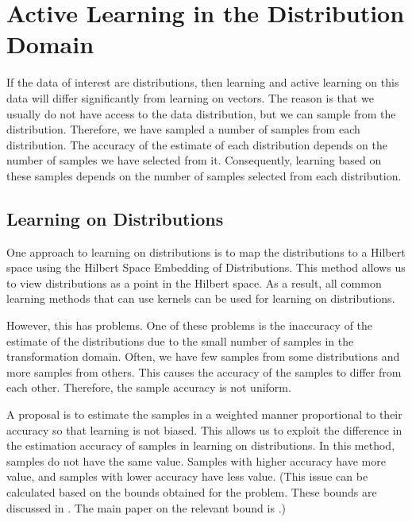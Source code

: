 	\section{Active Learning in the Distribution Domain}
	If the data of interest are distributions, then learning and active learning on this data will differ significantly from learning on vectors. The reason is that we usually do not have access to the data distribution, but we can sample from the distribution. Therefore, we have sampled a number of samples from each distribution. The accuracy of the estimate of each distribution depends on the number of samples we have selected from it. Consequently, learning based on these samples depends on the number of samples selected from each distribution.
	
	\subsection{Learning on Distributions}
	One approach to learning on distributions is to map the distributions to a Hilbert space using the Hilbert Space Embedding of Distributions. This method allows us to view distributions as a point in the Hilbert space. As a result, all common learning methods that can use kernels can be used for learning on distributions.
	
	However, this has problems. One of these problems is the inaccuracy of the estimate of the distributions due to the small number of samples in the transformation domain. Often, we have few samples from some distributions and more samples from others. This causes the accuracy of the samples to differ from each other. Therefore, the sample accuracy is not uniform.
	
	A proposal is to estimate the samples in a weighted manner proportional to their accuracy so that learning is not biased. This allows us to exploit the difference in the estimation accuracy of samples in learning on distributions. In this method, samples do not have the same value. Samples with higher accuracy have more value, and samples with lower accuracy have less value. (This issue can be calculated based on the bounds obtained for the problem. These bounds are discussed in \cite{muandet2012domain}. The main paper on the relevant bound is \cite{muandet2012domain}.)
	
